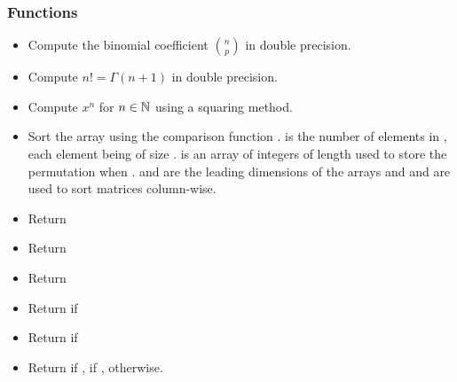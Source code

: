 \subsubsection{Functions}
\begin{itemize}
\item {}
  \sshortdescribe Compute the binomial coefficient $\binom{n}{p}$ in double
  precision.

\item {}
  \sshortdescribe Compute $n! = \Gamma(n+1)$ in double precision.

\item {}
  \sshortdescribe Compute $x^n$ for $n \in {\mathbb N}$ using a squaring method.


\item {}
  \sshortdescribe Sort the array  using the comparison function
  .  is the number of elements in , each element being of
  size .  is an array of integers of length  used to store
  the permutation when .  and  are the
  leading dimensions of the arrays  and  and are used to sort
  matrices column-wise. 

\item {}
  \sshortdescribe Return 

\item {}
  \sshortdescribe Return  

\item {}
  \sshortdescribe Return  

\item {}
  \sshortdescribe Return  if 

\item {}
  \sshortdescribe Return  if 

\item {}
  \sshortdescribe Return  if ,  if ,
   otherwise.
\end{itemize}

